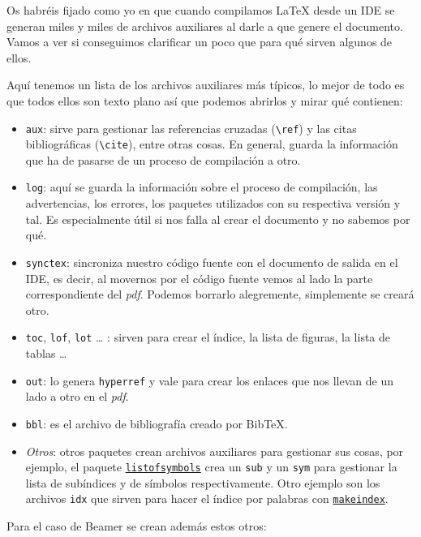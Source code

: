 Os habréis fijado como yo en que cuando compilamos LaTeX desde un IDE se
generan miles y miles de archivos auxiliares al darle a que genere el
documento. Vamos a ver si conseguimos clarificar un poco que para qué
sirven algunos de ellos.

Aquí tenemos un lista de los archivos auxiliares más típicos, lo mejor
de todo es que todos ellos son texto plano así que podemos abrirlos y
mirar qué contienen:

\begin{itemize}
\item
  \lstinline!aux!: sirve para gestionar las referencias cruzadas
  (\lstinline!\ref!) y las citas bibliográficas (\lstinline!\cite!),
  entre otras cosas. En general, guarda la información que ha de pasarse
  de un proceso de compilación a otro.
\item
  \lstinline!log!: aquí se guarda la información sobre el proceso de
  compilación, las advertencias, los errores, los paquetes utilizados
  con su respectiva versión y tal. Es especialmente útil si nos falla al
  crear el documento y no sabemos por qué.
\item
  \lstinline!synctex!: sincroniza nuestro código fuente con el documento
  de salida en el IDE, es decir, al movernos por el código fuente vemos
  al lado la parte correspondiente del \emph{pdf}. Podemos borrarlo
  alegremente, simplemente se creará otro.
\item
  \lstinline!toc!, \lstinline!lof!, \lstinline!lot! \ldots{} : sirven
  para crear el índice, la lista de figuras, la lista de tablas \ldots{}
\item
  \lstinline!out!: lo genera \lstinline!hyperref! y vale para crear los
  enlaces que nos llevan de un lado a otro en el \emph{pdf}.
\item
  \lstinline!bbl!: es el archivo de bibliografía creado por BibTeX.
\item
  \emph{Otros}: otros paquetes crean archivos auxiliares para gestionar
  sus cosas, por ejemplo, el paquete
  \href{http://ctan.org/pkg/listofsymbols}{\lstinline!listofsymbols!}
  crea un \lstinline!sub! y un \lstinline!sym! para gestionar la lista
  de subíndices y de símbolos respectivamente. Otro ejemplo son los
  archivos \lstinline!idx! que sirven para hacer el índice por palabras
  con
  \href{https://en.wikibooks.org/wiki/LaTeX/Indexing}{\lstinline!makeindex!}.
\end{itemize}

Para el caso de Beamer se crean además estos otros:

